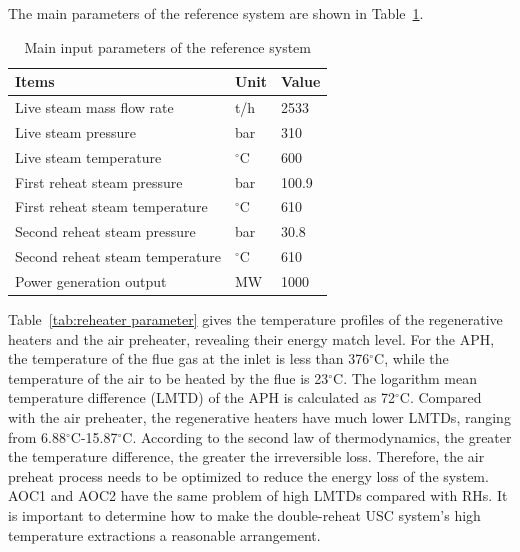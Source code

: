\documentclass[preprint,12pt]{elsarticle}
\begin{document}
The main parameters of the reference system are shown in Table~\ref{tab:ref input}.

\begin{table}[htbp]
\caption{Main input parameters of the reference system }
\label{tab:ref input}
\centering
\begin{tabular}{lll}
\toprule 
Items & Unit & Value\tabularnewline
\midrule
 Live steam mass flow rate 	    	&t/h 			&2533 \\
 Live steam pressure 		    	&bar 			&310\\
 Live steam temperature		     	&$^\circ$C		&600		\\
 First reheat steam pressure    	&bar			&100.9		\\
 First reheat steam temperature  	&$^\circ$C		&610		\\
 Second reheat steam pressure    	&bar			&30.8		\\
 Second reheat steam temperature 	&$^\circ$C		&610		\\
 Power generation output 			&MW				&1000		\\
\bottomrule
\end{tabular}	
\end{table}

Table~\ref{tab:reheater parameter} gives the temperature profiles of the regenerative heaters and the air preheater, revealing their energy match level.
For the APH, the temperature of the flue gas at the inlet is less than 376$^\circ$C,  
 while the temperature of the air to be heated by the flue is 23$^\circ$C.
The logarithm mean temperature difference (LMTD) of the APH is calculated as 72$^\circ$C.
Compared with the air preheater, the regenerative heaters have much lower LMTDs, ranging from 6.88$^\circ$C-15.87$^\circ$C.
According to the second law of thermodynamics, the greater the temperature difference, the greater the irreversible loss.
Therefore, the air preheat process needs to be optimized to reduce the energy loss of the system.
AOC1 and AOC2 have the same problem of high LMTDs compared with RHs.
It is important to determine how to make the double-reheat USC system's high temperature extractions a reasonable arrangement. 
\end{document}

